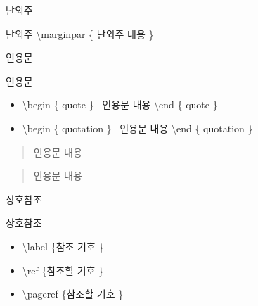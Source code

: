 \documentclass[ aspectratio=149,  10pt,blue,xcolor=pdftex,dvipsnames,table,handout,notes]{beamer}
\begin{document}

		\begin{frame}[t]{난외주}

			\begin{block} {난외주}
			\textbackslash marginpar \{ 난외주 내용 \}
			\end{block}

		\note[item]{}
		\end{frame}



		\begin{frame}[t]{인용문}

			\begin{block} {인용문}
			\begin{itemize}
			\item[]	\textbackslash begin \{ quote \} ~인용문 내용 \textbackslash end \{ quote \} \\
			\item[]	\textbackslash begin \{ quotation \} ~인용문 내용 \textbackslash end \{ quotation \} 
			\end{itemize}
			\end{block}

			\begin{example}
				\begin{quote} 인용문 내용 \end{quote} 
				\begin{quotation} 인용문 내용 \end{quotation}
			\end{example}


		\note[item]{}
		\end{frame}






		\begin{frame}[t]{상호참조}

			\begin{block} {상호참조}
				\begin{itemize}
				\item \textbackslash label \{참조 기호 \}
				\item \textbackslash ref \{참조할 기호 \}
				\item \textbackslash pageref \{참조할 기호 \}
				\end{itemize}
			\end{block}

		\note[item]{}
		\end{frame}
\end{document}
